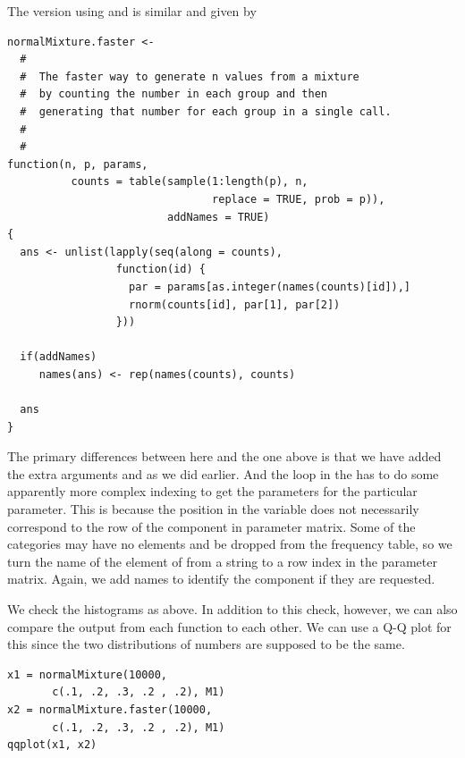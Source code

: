 The version using  and 
is similar and given by
{\footnotesize{
\begin{verbatim}
normalMixture.faster <-
  #
  #  The faster way to generate n values from a mixture
  #  by counting the number in each group and then 
  #  generating that number for each group in a single call.
  #
  #
function(n, p, params, 
          counts = table(sample(1:length(p), n, 
                                replace = TRUE, prob = p)),
                         addNames = TRUE)
{
  ans <- unlist(lapply(seq(along = counts),
                 function(id) {
                   par = params[as.integer(names(counts)[id]),]
                   rnorm(counts[id], par[1], par[2])
                 }))

  if(addNames)
     names(ans) <- rep(names(counts), counts)

  ans
}
\end{verbatim}
}}
The primary differences between here and the one above is that we have
added the extra arguments  and 
as we did earlier.  And the loop in the  has to do
some apparently more complex indexing to get the parameters for the
particular parameter.  This is because the position in the
 variable does not necessarily correspond to the row
of the component in parameter matrix.  Some of the
categories may have no elements and be dropped from the frequency
table, so we turn the name of the element of  from a
string to a row index in the parameter matrix.  Again, we add names to
identify the component if they are requested.

We check the histograms as above.  In addition to this check, however,
we can also compare the output from each function to each other.  We
can use a Q-Q plot for this since the two distributions of numbers are
supposed to be the same.

\begin{verbatim}
x1 = normalMixture(10000, 
       c(.1, .2, .3, .2 , .2), M1)
x2 = normalMixture.faster(10000, 
       c(.1, .2, .3, .2 , .2), M1)
qqplot(x1, x2)
\end{verbatim}



